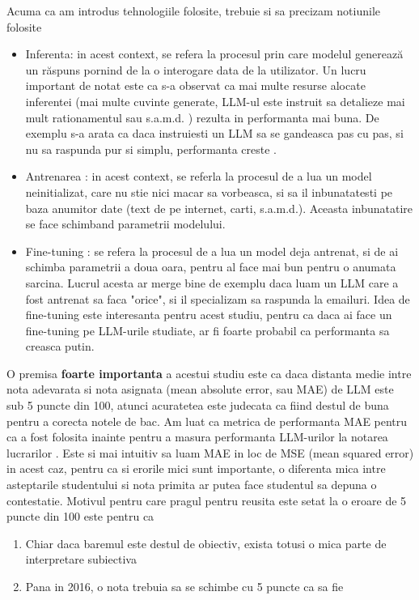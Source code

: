 Acuma ca am introdus tehnologiile folosite, trebuie si sa precizam notiunile folosite
\begin{itemize}
    \item Inferenta: in acest context, se refera la procesul prin care modelul generează un răspuns pornind de la o interogare data de la utilizator.
    Un lucru important de notat este ca s-a observat ca mai multe resurse alocate inferentei (mai multe cuvinte generate,
    LLM-ul este instruit sa detalieze mai mult rationamentul sau s.a.m.d. )
    rezulta in performanta mai buna. De exemplu s-a arata ca daca instruiesti un LLM sa se gandeasca pas cu pas, si nu sa raspunda pur si simplu, performanta creste \cite{cot}.
    \item Antrenarea : in acest context, se referla la procesul de a lua un model neinitializat, care nu stie nici macar sa vorbeasca, si sa
    il inbunatatesti pe baza anumitor date (text de pe internet, carti, s.a.m.d.). Aceasta inbunatatire se face schimband parametrii modelului.
    \item Fine-tuning : se refera la procesul de a lua un model deja antrenat, si de ai schimba parametrii a doua oara, pentru al face mai bun
    pentru o anumata sarcina. Lucrul acesta ar merge bine de exemplu daca luam un LLM care a fost antrenat sa faca "orice", si il specializam sa 
    raspunda la emailuri. Idea de fine-tuning este interesanta pentru acest studiu, pentru ca daca ai face un fine-tuning pe LLM-urile studiate, 
    ar fi foarte probabil ca performanta sa creasca putin.

\end{itemize}

O premisa \textbf{foarte importanta} a acestui studiu este ca daca distanta medie intre nota adevarata si nota asignata (mean absolute error, sau MAE) de LLM este sub 5 puncte din 100, 
atunci acuratetea este judecata ca fiind destul de buna pentru a corecta notele de bac. 
Am luat ca metrica de performanta MAE pentru ca a fost folosita inainte pentru a masura performanta LLM-urilor la notarea lucrarilor \cite{golchin}.
Este si mai intuitiv sa luam MAE in loc de MSE (mean squared error) in acest caz, pentru ca si erorile mici sunt importante, o diferenta 
mica intre asteptarile studentului si nota primita ar
putea face studentul sa depuna o contestatie. Motivul pentru care pragul pentru reusita este setat la o eroare de 5 puncte din 100 este pentru ca 
\begin{enumerate}
    \item Chiar daca baremul este destul de obiectiv, exista totusi o mica parte de interpretare subiectiva
    \item Pana in 2016, o nota trebuia sa se schimbe cu 5 puncte ca sa fie 
\end{enumerate}